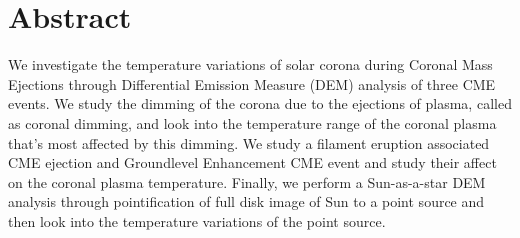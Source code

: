 \section{Abstract}


We investigate the temperature variations of solar corona during Coronal Mass Ejections through Differential Emission Measure (DEM) analysis of three CME events. We study the dimming of the corona due to the ejections of plasma, called as coronal dimming, and look into the temperature range of the coronal plasma that's most affected by this dimming. We study a filament eruption associated CME ejection and Groundlevel Enhancement CME event and study their affect on the coronal plasma temperature. Finally, we perform a Sun-as-a-star DEM analysis through pointification of full disk image of Sun to a point source and then look into the temperature variations of the point source.

